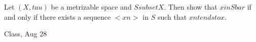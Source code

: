 \begin{samepage}
\begin{ex}
Let $(X, tau)$ be a metrizable space and $S subset X$. Then show that $x in S bar$ if and only if there exists a sequence $<xn>$ in $S$ such that $xn tends to x$.
\end{ex}
\begin{source}
Class, Aug 28
\end{source}
\end{samepage}
